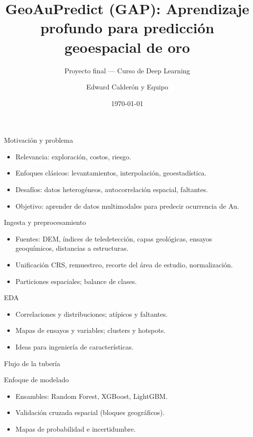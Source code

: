 \documentclass[aspectratio=169]{beamer}
\title{GeoAuPredict (GAP): Aprendizaje profundo para predicción geoespacial de oro}
\subtitle{Proyecto final — Curso de Deep Learning}
\author{Edward Calderón y Equipo}
\date{\today}
\begin{document}
\frame{\titlepage}

\begin{frame}{Motivación y problema}
  \begin{itemize}
    \item Relevancia: exploración, costos, riesgo.
    \item Enfoques clásicos: levantamientos, interpolación, geoestadística.
    \item Desafíos: datos heterogéneos, autocorrelación espacial, faltantes.
    \item Objetivo: aprender de datos multimodales para predecir ocurrencia de Au.
  \end{itemize}
\end{frame}

\begin{frame}{Ingesta y preprocesamiento}
  \begin{itemize}
    \item Fuentes: DEM, índices de teledetección, capas geológicas, ensayos geoquímicos, distancias a estructuras.
    \item Unificación CRS, remuestreo, recorte del área de estudio, normalización.
    \item Particiones espaciales; balance de clases.
  \end{itemize}
\end{frame}

\begin{frame}{EDA}
  \begin{itemize}
    \item Correlaciones y distribuciones; atípicos y faltantes.
    \item Mapas de ensayos y variables; clusters y hotspots.
    \item Ideas para ingeniería de características.
  \end{itemize}
\end{frame}

\begin{frame}{Flujo de la tubería}
  \centering
  \resizebox{!}{0.78\textheight}{}
\end{frame}

\begin{frame}{Enfoque de modelado}
  \begin{itemize}
    \item Ensambles: Random Forest, XGBoost, LightGBM.
    \item Validación cruzada espacial (bloques geográficos).
    \item Mapas de probabilidad e incertidumbre.
  \end{itemize}
\end{frame}
\end{document}
